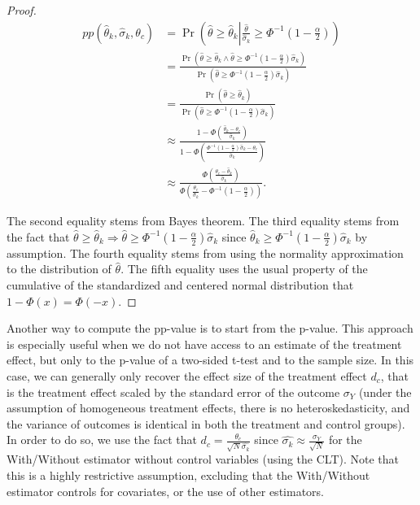 \documentclass[
]{book}
\theoremstyle{definition}
\theoremstyle{definition}
\theoremstyle{definition}
\theoremstyle{definition}
\theoremstyle{remark}
\begin{document}
\begin{proof}
\iffalse{} {Proof. } \fi{}\begin{align*}
  pp(\hat{\theta}_k,\hat{\sigma}_k,\theta_c) & = \Pr\left(\hat{\theta}\geq\hat{\theta}_k\left|\frac{\hat{\theta}}{\hat{\sigma}_k}
                                                    \geq\Phi^{-1}\left(1-\frac{\alpha}{2}\right)\right.\right)\\
                                              & = \frac{\Pr\left(\hat{\theta}\geq\hat{\theta}_k\land\hat{\theta}\geq\Phi^{-1}\left(1-\frac{\alpha}{2}\right)\hat{\sigma}_k\right)}
            {\Pr\left(\hat{\theta}\geq\Phi^{-1}\left(1-\frac{\alpha}{2}\right)\hat{\sigma}_k\right)} \\
              & = \frac{\Pr\left(\hat{\theta}\geq\hat{\theta}_k\right)}
            {\Pr\left(\hat{\theta}\geq\Phi^{-1}\left(1-\frac{\alpha}{2}\right)\hat{\sigma}_k\right)} \\
  & \approx \frac{1-\Phi\left(\frac{\hat{\theta}_k-\theta_c}{\hat{\sigma}_k}\right)}
                                                      {1-\Phi\left(\frac{\Phi^{-1}\left(1-\frac{\alpha}{2}\right)\hat{\sigma}_k-\theta_c}
                                                                  {\hat{\sigma}_k}\right)}\\
 & \approx \frac{\Phi\left(\frac{\theta_c-\hat{\theta}_k}{\hat{\sigma}_k}\right)}
                                                      {\Phi\left(\frac{\theta_c}{\hat{\sigma}_k}-\Phi^{-1}\left(1-\frac{\alpha}{2}\right)\right)}.
\end{align*}

The second equality stems from Bayes theorem.
The third equality stems from the fact that \(\hat{\theta}\geq\hat{\theta}_k\Rightarrow\hat{\theta}\geq\Phi^{-1}\left(1-\frac{\alpha}{2}\right)\hat{\sigma}_k\) since \(\hat{\theta}_k\geq\Phi^{-1}\left(1-\frac{\alpha}{2}\right)\hat{\sigma}_k\) by assumption.
The fourth equality stems from using the normality approximation to the distribution of \(\hat{\theta}\).
The fifth equality uses the usual property of the cumulative of the standardized and centered normal distribution that \(1-\Phi(x)=\Phi(-x)\).
\end{proof}

Another way to compute the pp-value is to start from the p-value.
This approach is especially useful when we do not have access to an estimate of the treatment effect, but only to the p-value of a two-sided t-test and to the sample size.
In this case, we can generally only recover the effect size of the treatment effect \(d_c\), that is the treatment effect scaled by the standard error of the outcome \(\sigma_{Y}\) (under the assumption of homogeneous treatment effects, there is no heteroskedasticity, and the variance of outcomes is identical in both the treatment and control groups).
In order to do so, we use the fact that \(d_c=\frac{\theta_c}{\sqrt{N}\hat{\sigma_k}}\) since \(\hat{\sigma_k}\approx\frac{\sigma_{Y}}{\sqrt{N}}\) for the With/Without estimator without control variables (using the CLT).
Note that this is a highly restrictive assumption, excluding that the With/Without estimator controls for covariates, or the use of other estimators.
\end{document}
